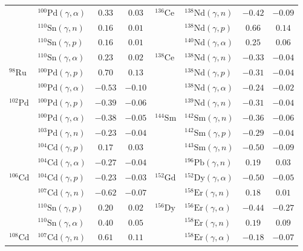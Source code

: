 \begin{table}
\begin{tabular}{llcc|llcc}
    $ $ & $^{100}\mathrm{Pd}(\gamma,\alpha)$ & $0.33$ & $0.03$ & $^{136}\mathrm{Ce}$ & $^{138}\mathrm{Nd}(\gamma,n)$ & $-0.42$ & $-0.09$ \\ 
    $ $ & $^{110}\mathrm{Sn}(\gamma,n)$ & $0.16$ & $0.01$ & $ $ & $^{138}\mathrm{Nd}(\gamma,p)$ & $0.66$ & $0.14$ \\ 
    $ $ & $^{110}\mathrm{Sn}(\gamma,p)$ & $0.16$ & $0.01$ & $ $ & $^{140}\mathrm{Nd}(\gamma,\alpha)$ & $0.25$ & $0.06$ \\ 
    $ $ & $^{110}\mathrm{Sn}(\gamma,\alpha)$ & $0.23$ & $0.02$ & $^{138}\mathrm{Ce}$ & $^{138}\mathrm{Nd}(\gamma,n)$ & $-0.33$ & $-0.04$ \\ 
    $^{98}\mathrm{Ru}$ & $^{100}\mathrm{Pd}(\gamma,p)$ & $0.70$ & $0.13$ & $ $ & $^{138}\mathrm{Nd}(\gamma,p)$ & $-0.31$ & $-0.04$ \\ 
    $ $ & $^{100}\mathrm{Pd}(\gamma,\alpha)$ & $-0.53$ & $-0.10$ & $ $ & $^{138}\mathrm{Nd}(\gamma,\alpha)$ & $-0.24$ & $-0.02$ \\ 
    $^{102}\mathrm{Pd}$ & $^{100}\mathrm{Pd}(\gamma,p)$ & $-0.39$ & $-0.06$ & $ $ & $^{139}\mathrm{Nd}(\gamma,n)$ & $-0.31$ & $-0.04$ \\ 
    $ $ & $^{100}\mathrm{Pd}(\gamma,\alpha)$ & $-0.38$ & $-0.05$ & $^{144}\mathrm{Sm}$ & $^{142}\mathrm{Sm}(\gamma,n)$ & $-0.36$ & $-0.06$ \\ 
    $ $ & $^{103}\mathrm{Pd}(\gamma,n)$ & $-0.23$ & $-0.04$ & $ $ & $^{142}\mathrm{Sm}(\gamma,p)$ & $-0.29$ & $-0.04$ \\ 
    $ $ & $^{104}\mathrm{Cd}(\gamma,p)$ & $0.17$ & $0.03$ & $ $ & $^{143}\mathrm{Sm}(\gamma,n)$ & $-0.50$ & $-0.09$ \\ 
    $ $ & $^{104}\mathrm{Cd}(\gamma,\alpha)$ & $-0.27$ & $-0.04$ & $ $ & $^{196}\mathrm{Pb}(\gamma,n)$ & $0.19$ & $0.03$ \\ 
    $^{106}\mathrm{Cd}$ & $^{104}\mathrm{Cd}(\gamma,p)$ & $-0.23$ & $-0.03$ & $^{152}\mathrm{Gd}$ & $^{152}\mathrm{Dy}(\gamma,\alpha)$ & $-0.50$ & $-0.05$ \\ 
    $ $ & $^{107}\mathrm{Cd}(\gamma,n)$ & $-0.62$ & $-0.07$ & $ $ & $^{158}\mathrm{Er}(\gamma,n)$ & $0.18$ & $0.01$ \\ 
    $ $ & $^{110}\mathrm{Sn}(\gamma,p)$ & $0.20$ & $0.02$ & $^{156}\mathrm{Dy}$ & $^{156}\mathrm{Er}(\gamma,\alpha)$ & $-0.44$ & $-0.27$ \\ 
    $ $ & $^{110}\mathrm{Sn}(\gamma,\alpha)$ & $0.40$ & $0.05$ & $ $ & $^{158}\mathrm{Er}(\gamma,n)$ & $0.19$ & $0.09$ \\ 
    $^{108}\mathrm{Cd}$ & $^{107}\mathrm{Cd}(\gamma,n)$ & $0.61$ & $0.11$ & $ $ & $^{158}\mathrm{Er}(\gamma,\alpha)$ & $-0.18$ & $-0.07$ \\ 

\end{tabular}
\end{table}
